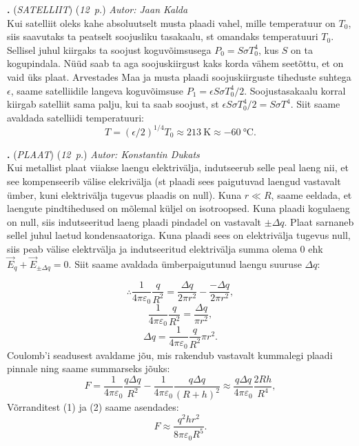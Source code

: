 \documentclass[11pt,a5paper]{article}
\newcommand{\numb}[1]{\vspace{5pt}\textbf{\large #1}}
\newcommand{\nimi}[1]{(\textsl{\small #1})}
\newcommand{\punktid}[1]{(\emph{#1~p.})}
\newcounter{ylesanne}
\newcommand{\yl}[1]{\addtocounter{ylesanne}{1}\numb{\theylesanne.} \nimi{#1} \newblock{}}
\newcommand{\autor}[1]{\emph{Autor: #1}}%
\begin{document}
\begin{figure}[h]
\centering
\end{figure}

\yl{SATELLIIT} \punktid{12} \autor{Jaan Kalda} \\
Kui satelliit oleks kahe absoluutselt musta plaadi vahel, mille temperatuur on $T_0$, siis saavutaks ta peatselt soojusliku tasakaalu, st omandaks temperatuuri $T_0$. Sellisel juhul kiirgaks ta soojust koguvõimsusega $P_0=S \sigma T^4_0$, kus $S$ on ta kogupindala. Nüüd saab ta aga soojuskiirgust kaks korda vähem seetõttu, et on vaid üks plaat. Arvestades Maa ja musta plaadi soojuskiirguste tiheduste suhtega $\epsilon$, saame satelliidile langeva koguvõimsuse $P_1=\epsilon S \sigma T^4_0/2$. Soojustasakaalu korral kiirgab satelliit sama palju, kui ta saab soojust, st $\epsilon S \sigma T^4_0/2=S \sigma T^4$. Siit saame avaldada satelliidi temperatuuri:
$$
T=(\epsilon/2)^{1/4}T_0 \approx \SI{213}{\kelvin} \approx \SI{-60}{\celsius}. 
$$

\yl{PLAAT} \punktid{12} \autor{Konstantin Dukats}\\
Kui metallist plaat viiakse laengu elektrivälja, indutseerub selle peal laeng nii, et see kompenseerib välise elekrivälja (st plaadi sees paigutuvad laengud vastavalt ümber, kuni elektrivälja tugevus plaadis on null). Kuna $r \ll R$, saame eeldada, et laengute pindtihedused on mõlemal küljel on isotroopsed. Kuna plaadi kogulaeng on null, siis indutseeritud laeng plaadi pindadel on vastavalt $\pm \Delta q$. Plaat sarnaneb sellel juhul laetud kondensaatoriga. Kuna plaadi sees on elektrivälja tugevus null, siis peab välise elektrvälja ja indutseeritud elektrivälja summa olema $0$ ehk $\vec{E}_q + \vec{E}_{\pm \Delta q}=0$. Siit saame avaldada ümberpaigutunud laengu suuruse $\Delta q$:

$$\therefore \frac{1}{4\pi \varepsilon_0} \frac{q}{R^2} = \frac{\Delta q}{2 \pi r^2} - \frac{-\Delta q}{2 \pi r^2},$$
$$\frac{1}{4\pi \varepsilon_0} \frac{q}{R^2} = \frac{\Delta q}{\pi r^2},$$
\begin{equation}
\Delta q = \frac{1}{4\pi \varepsilon_0} \frac{q}{R^2} \pi r^2.
\end{equation}
Coulomb'i seadusest avaldame jõu, mis rakendub vastavalt kummalegi plaadi pinnale ning saame summarseks jõuks:
\begin{equation}
F = \frac{1}{4 \pi \varepsilon_0} \frac{q \Delta q}{R^2} - \frac{1}{4 \pi \varepsilon_0} \frac{q \Delta q}{(R+h)^2} \approx \frac{q \Delta q}{4 \pi \varepsilon_0} \frac{2Rh}{R^4},
\end{equation}
Võrranditest (1) ja (2) saame asendades:
$$F \approx \frac{q^2 h r^2}{8 \pi \varepsilon_0 R^5}.$$
\end{document}

